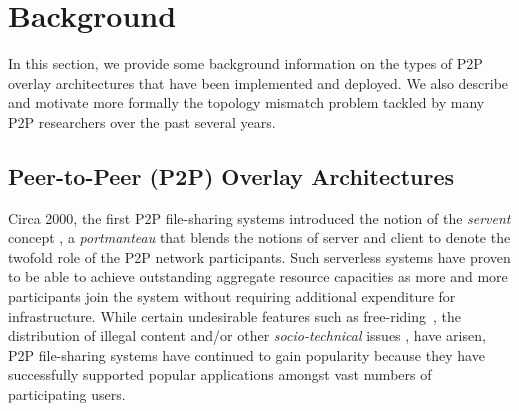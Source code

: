 \section{Background}
\label{section:background}


In this section, we provide some background information on the types
of P2P overlay architectures that have been implemented and deployed.  We also
describe and motivate more formally the topology mismatch problem tackled
by many P2P researchers over the past several years.


\subsection{Peer-to-Peer (P2P) Overlay Architectures}
Circa 2000, the first P2P file-sharing systems introduced the notion 
of the \emph{servent} concept \cite{gnutella}, a \emph{portmanteau} that blends
the notions of server and client to denote the twofold role of the P2P network
participants. Such serverless systems have proven to be able to achieve outstanding
aggregate resource capacities as more and more participants join the system
without requiring additional expenditure for infrastructure.  While
certain undesirable features such as 
free-riding~\cite{saroiu_measurefileshare_2002,adar_gnutellafreeriders_2000,hughes_gnutellafreeride_2005},
the distribution of illegal content and/or other \emph{socio-technical}
issues \cite{hughes_socp2p_2008}, have arisen, P2P file-sharing systems 
have continued
to gain popularity because they have successfully supported
popular
applications amongst vast numbers of participating
users. 

